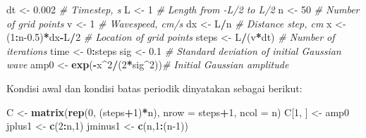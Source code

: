 \documentclass[]{book}
\newenvironment{Shaded}{\begin{snugshade}}{\end{snugshade}}
\newcommand{\CommentTok}[1]{\textcolor[rgb]{0.56,0.35,0.01}{\textit{#1}}}
\newcommand{\DataTypeTok}[1]{\textcolor[rgb]{0.13,0.29,0.53}{#1}}
\newcommand{\DecValTok}[1]{\textcolor[rgb]{0.00,0.00,0.81}{#1}}
\newcommand{\FloatTok}[1]{\textcolor[rgb]{0.00,0.00,0.81}{#1}}
\newcommand{\KeywordTok}[1]{\textcolor[rgb]{0.13,0.29,0.53}{\textbf{#1}}}
\newcommand{\NormalTok}[1]{#1}
\newcommand{\OperatorTok}[1]{\textcolor[rgb]{0.81,0.36,0.00}{\textbf{#1}}}
\newcommand{\StringTok}[1]{\textcolor[rgb]{0.31,0.60,0.02}{#1}}
\theoremstyle{definition}
\theoremstyle{definition}
\theoremstyle{definition}
\theoremstyle{remark}
\begin{document}
\begin{Shaded}
\begin{Highlighting}[]
\NormalTok{dt    <-}\StringTok{ }\FloatTok{0.002}              \CommentTok{# Timestep, s}
\NormalTok{L     <-}\StringTok{ }\DecValTok{1}                  \CommentTok{# Length from -L/2 to L/2}
\NormalTok{n     <-}\StringTok{ }\DecValTok{50}                 \CommentTok{# Number of grid points}
\NormalTok{v     <-}\StringTok{ }\DecValTok{1}                  \CommentTok{# Wavespeed, cm/s}
\NormalTok{dx    <-}\StringTok{ }\NormalTok{L}\OperatorTok{/}\NormalTok{n                }\CommentTok{# Distance step, cm}
\NormalTok{x     <-}\StringTok{ }\NormalTok{(}\DecValTok{1}\OperatorTok{:}\NormalTok{n}\FloatTok{-0.5}\NormalTok{)}\OperatorTok{*}\NormalTok{dx}\OperatorTok{-}\NormalTok{L}\OperatorTok{/}\DecValTok{2}   \CommentTok{# Location of grid points}
\NormalTok{steps <-}\StringTok{ }\NormalTok{L}\OperatorTok{/}\NormalTok{(v}\OperatorTok{*}\NormalTok{dt)           }\CommentTok{# Number of iterations}
\NormalTok{time  <-}\StringTok{ }\DecValTok{0}\OperatorTok{:}\NormalTok{steps  }
\NormalTok{sig   <-}\StringTok{ }\FloatTok{0.1}                \CommentTok{# Standard deviation of initial Gaussian wave}
\NormalTok{amp0  <-}\StringTok{ }\KeywordTok{exp}\NormalTok{(}\OperatorTok{-}\NormalTok{x}\OperatorTok{^}\DecValTok{2}\OperatorTok{/}\NormalTok{(}\DecValTok{2}\OperatorTok{*}\NormalTok{sig}\OperatorTok{^}\DecValTok{2}\NormalTok{))}\CommentTok{# Initial Gaussian amplitude}
\end{Highlighting}
\end{Shaded}

Kondisi awal dan kondisi batas periodik dinyatakan sebagai berikut:

\begin{Shaded}
\begin{Highlighting}[]
\NormalTok{C <-}\StringTok{ }\KeywordTok{matrix}\NormalTok{(}\KeywordTok{rep}\NormalTok{(}\DecValTok{0}\NormalTok{, (steps}\OperatorTok{+}\DecValTok{1}\NormalTok{)}\OperatorTok{*}\NormalTok{n), }\DataTypeTok{nrow =}\NormalTok{ steps}\OperatorTok{+}\DecValTok{1}\NormalTok{, }\DataTypeTok{ncol =}\NormalTok{ n)}
\NormalTok{C[}\DecValTok{1}\NormalTok{, ] <-}\StringTok{ }\NormalTok{amp0}
\NormalTok{jplus1 <-}\StringTok{ }\KeywordTok{c}\NormalTok{(}\DecValTok{2}\OperatorTok{:}\NormalTok{n,}\DecValTok{1}\NormalTok{)}
\NormalTok{jminus1 <-}\StringTok{ }\KeywordTok{c}\NormalTok{(n,}\DecValTok{1}\OperatorTok{:}\NormalTok{(n}\DecValTok{-1}\NormalTok{))}
\end{Highlighting}
\end{Shaded}
\end{document}
